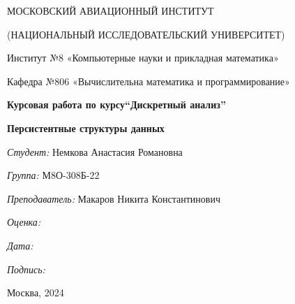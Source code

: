 \documentclass[12pt]{article}
\begin{document}
\thispagestyle{empty}	
\begin{center}
	МОСКОВСКИЙ АВИАЦИОННЫЙ ИНСТИТУТ
	
	(НАЦИОНАЛЬНЫЙ ИССЛЕДОВАТЕЛЬСКИЙ УНИВЕРСИТЕТ)
\vspace{3ex}

	Институт №8 «Компьютерные науки и прикладная математика»
    
	Кафедра №806 «Вычислительна математика и программирование»
	
\end{center}
\vspace{25ex}
\begin{center}
	\textbf{\large{Курсовая работа по курсу\linebreak \textquotedblleft Дискретный анализ\textquotedblright}}
\end{center}
\vspace{3ex}
\begin{center}
    \textbf{\large{Персистентные структуры данных}}
\end{center}
\vspace{20ex}
\begin{flushright}
	\textit{Студент: } Немкова Анастасия Романовна
	
	\vspace{2ex}
	\textit{Группа: } М8О-308Б-22
	
	\vspace{2ex}
	\textit{Преподаватель: } Макаров Никита Константинович 
	
	\vspace{2ex}
	\textit{Оценка: } \underline{\quad\quad\quad\quad\quad\quad}
	
	 \vspace{2ex}
	\textit{Дата: } \underline{\quad\quad\quad\quad\quad\quad}
	
	\vspace{2ex}
	\textit{Подпись: } \underline{\quad\quad\quad\quad\quad\quad}
	
\end{flushright}
\vspace{5ex}

\begin{vfill}
	\begin{center}
		Москва, 2024
	\end{center}	
\end{vfill}
\newpage
\end{document}
